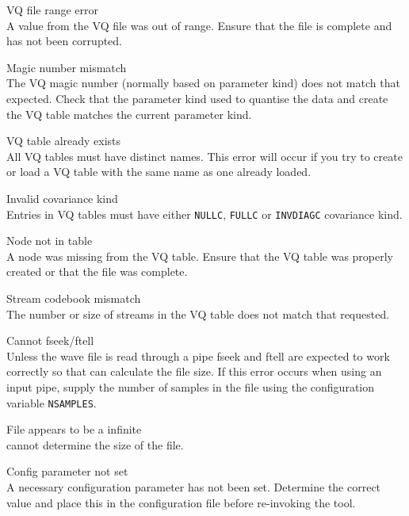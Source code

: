 \begin{itemize}
\begin{itemize}
    VQ file range error\\
        A value from the VQ file was out of range.  Ensure that the file is 
        complete and has not been corrupted.

    Magic number mismatch\\
        The VQ magic number (normally based on parameter kind) does not match
        that expected.  Check that the parameter kind used to quantise the data
        and create the VQ table matches the current parameter kind.

    VQ table already exists\\
        All VQ tables must have distinct names.  This error will occur if you
        try to create or load a VQ table with the same name as one already
        loaded.

    Invalid covariance kind\\
        Entries in VQ tables must have either \texttt{NULLC}, \texttt{FULLC} or
        \texttt{INVDIAGC} covariance kind.

    Node not in table\\
        A node was missing from the VQ table.  Ensure that the VQ table was 
        properly created or that the file was complete.

    Stream codebook mismatch\\
        The number or size of streams in the VQ table does not match that 
        requested.

\end{itemize}


\begin{itemize}
    Cannot fseek/ftell\\
        Unless the wave file is read through a pipe fseek and ftell are 
        expected to work correctly so that  can calculate the 
        file size.  If this error occurs when using an input pipe, supply 
        the number of samples in the file using the configuration variable
        \texttt{NSAMPLES}.

    File appears to be a infinite\\
         cannot determine the size of the file.

    Config parameter not set\\
        A necessary configuration parameter has not been set.  Determine the 
        correct value and place this in the configuration file before 
        re-invoking the tool.


\end{itemize}
\end{itemize}
